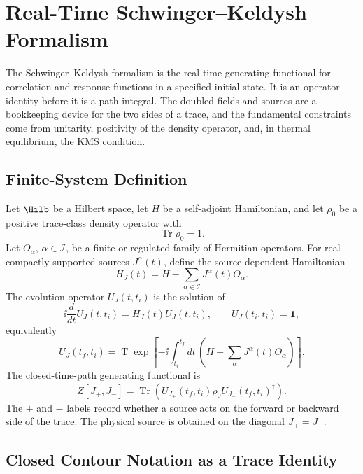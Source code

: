 \chapter{Real-Time Schwinger--Keldysh Formalism}
\label{ch:thermal-schwinger-keldysh}

\ConventionsRealTime

The Schwinger--Keldysh formalism is the real-time generating functional for
correlation and response functions in a specified initial state.  It is an
operator identity before it is a path integral.  The doubled fields and
sources are a bookkeeping device for the two sides of a trace, and the
fundamental constraints come from unitarity, positivity of the density
operator, and, in thermal equilibrium, the KMS condition.

\section{Finite-System Definition}

Let \(\Hilb\) be a Hilbert space, let \(H\) be a self-adjoint Hamiltonian, and
let \(\rho_0\) be a positive trace-class density operator with
\[
  \operatorname{Tr}\rho_0=1 .
\]
Let \(O_\alpha\), \(\alpha\in\mathcal I\), be a finite or regulated family of
Hermitian operators.  For real compactly supported sources \(J^\alpha(t)\),
define the source-dependent Hamiltonian
\[
  H_J(t)=H-\sum_{\alpha\in\mathcal I} J^\alpha(t)O_\alpha .
\]
The evolution operator \(U_J(t,t_i)\) is the solution of
\[
  \ii\frac{d}{dt}U_J(t,t_i)=H_J(t)U_J(t,t_i),
  \qquad U_J(t_i,t_i)=\mathbf 1 ,
\]
equivalently
\[
  U_J(t_f,t_i)
  =
  \operatorname{T}\exp\!\left[
  -\ii\int_{t_i}^{t_f}dt\,
  \left(H-\sum_{\alpha}J^\alpha(t)O_\alpha\right)\right].
\]
The closed-time-path generating functional is
\begin{equation}
  Z[J_+,J_-]
  =
  \operatorname{Tr}\!\left(
    U_{J_+}(t_f,t_i)\rho_0
    U_{J_-}(t_f,t_i)^\dagger
  \right).
  \label{eq:sk-operator-generating-functional}
\end{equation}
The \(+\) and \(-\) labels record whether a source acts on the forward or
backward side of the trace.  The physical source is obtained on the diagonal
\(J_+=J_-\).

\section{Closed Contour Notation as a Trace Identity}

